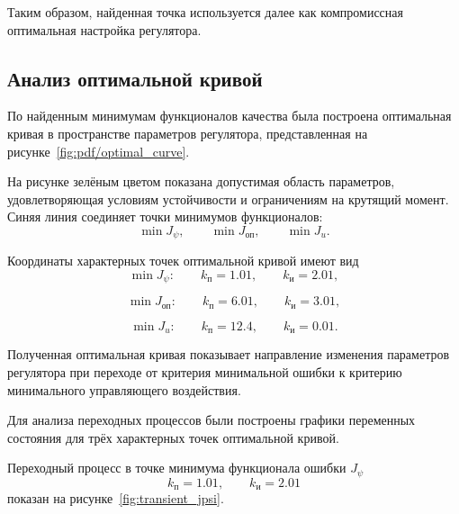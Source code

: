 Таким образом, найденная точка используется далее как компромиссная оптимальная настройка регулятора.

\subsection{Анализ оптимальной кривой}

По найденным минимумам функционалов качества была построена оптимальная кривая в пространстве параметров регулятора, представленная на рисунке~\ref{fig:pdf/optimal_curve}.


На рисунке зелёным цветом показана допустимая область параметров, удовлетворяющая условиям устойчивости и ограничениям на крутящий момент. Синяя линия соединяет точки минимумов функционалов:
\begin{equation}
\min J_{\psi},
\qquad
\min J_{\text{оп}},
\qquad
\min J_u.
\end{equation}

Координаты характерных точек оптимальной кривой имеют вид
\begin{equation}
\min J_{\psi}:
\qquad
k_{\text{п}} = 1.01,
\qquad
k_{\text{и}} = 2.01,
\end{equation}

\begin{equation}
\min J_{\text{оп}}:
\qquad
k_{\text{п}} = 6.01,
\qquad
k_{\text{и}} = 3.01,
\end{equation}

\begin{equation}
\min J_u:
\qquad
k_{\text{п}} = 12.4,
\qquad
k_{\text{и}} = 0.01.
\end{equation}

Полученная оптимальная кривая показывает направление изменения параметров регулятора при переходе от критерия минимальной ошибки к критерию минимального управляющего воздействия.

Для анализа переходных процессов были построены графики переменных состояния для трёх характерных точек оптимальной кривой.

Переходный процесс в точке минимума функционала ошибки \(J_{\psi}\)
\begin{equation}
k_{\text{п}} = 1.01,
\qquad
k_{\text{и}} = 2.01
\end{equation}
показан на рисунке~\ref{fig:transient_jpsi}.


